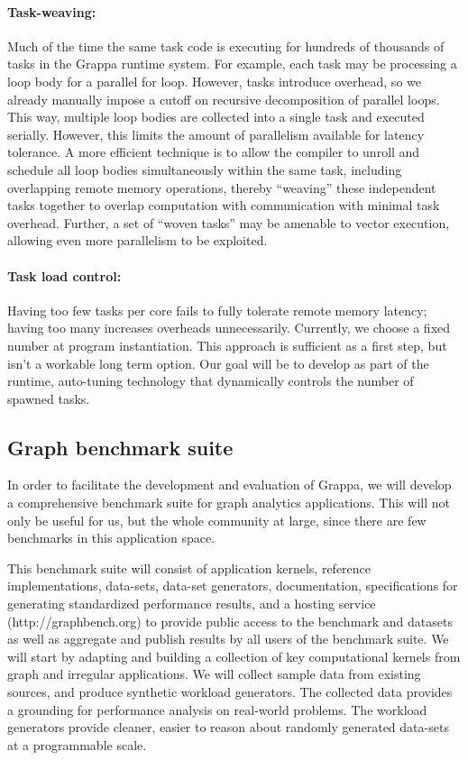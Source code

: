 \paragraph{Task-weaving: } Much of the time the same task code is executing for hundreds of thousands of tasks in the Grappa runtime system.  For example, each task may be processing a loop body for a parallel for loop.  However, tasks introduce overhead, so we already manually impose a cutoff on recursive decomposition of parallel loops.  This way, multiple loop bodies are collected into a single task and executed serially.  However, this limits the amount of parallelism available for latency tolerance. A more efficient technique is to allow the compiler to unroll and schedule all loop bodies simultaneously within the same task, including overlapping remote memory operations, thereby ``weaving'' these independent tasks together to overlap computation with communication with minimal task overhead.  Further, a set of ``woven tasks'' may be amenable to vector execution, allowing even more parallelism to be exploited.

\paragraph{Task load control:} Having too few tasks per core fails to fully tolerate remote memory latency; having too many increases overheads unnecessarily. Currently, we choose a fixed number at program instantiation.  This approach is sufficient as a first step, but isn't a workable long term option.  Our goal will be to develop as part of the runtime, auto-tuning technology that dynamically controls the number of spawned tasks.

\subsection{Graph benchmark suite}

In order to facilitate the development and evaluation of Grappa, we will develop a comprehensive benchmark suite for graph analytics applications. This will not only be useful for us, but the whole community at large, since there are few benchmarks in this application space.

This benchmark suite will consist of application kernels, reference implementations, data-sets, data-set generators, documentation, specifications for generating standardized performance results, and a hosting service (http://graphbench.org) to provide public access to the benchmark and datasets as well as aggregate and publish results by all users of the benchmark suite.  We will start by adapting and building a collection of key computational kernels from graph and irregular applications.  We will collect sample data from existing sources, and produce synthetic workload generators. The collected data provides a grounding for performance analysis on real-world problems. The workload generators provide cleaner, easier to reason about randomly generated data-sets at a programmable scale.

